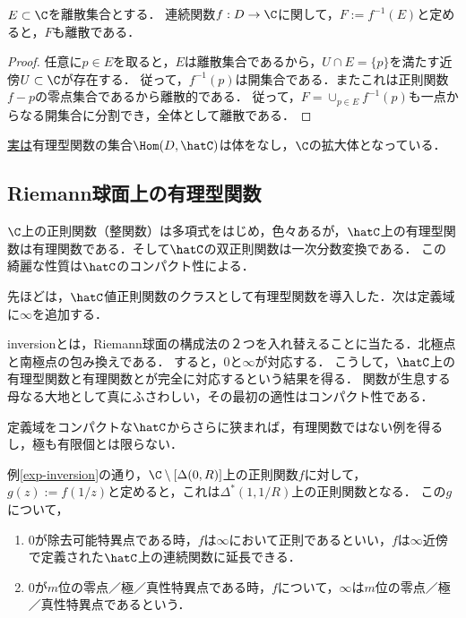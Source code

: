 \documentclass[uplatex, dvipdfmx]{jsreport}
\begin{document}
\begin{lemma}[有理型関数は合成について閉じている]
    $E\subset\C$を離散集合とする．
    連続関数$f:D\to\C$に関して，$F:=f^{-1}(E)$と定めると，$F$も離散である．
\end{lemma}
\begin{proof}
    任意に$p\in E$を取ると，$E$は離散集合であるから，$U\cap E=\{p\}$を満たす近傍$U\subset\C$が存在する．
    従って，$f^{-1}(p)$は開集合である．またこれは正則関数$f-p$の零点集合であるから離散的である．
    従って，$F=\cup_{p\in E}f^{-1}(p)$も一点からなる開集合に分割でき，全体として離散である．
\end{proof}

\begin{remark}
    \href{https://ja.wikipedia.org/wiki/有理型関数}{実は}有理型関数の集合$\Hom(D,\hatC)$は体をなし，$\C$の拡大体となっている．
\end{remark}

\subsection{Riemann球面上の有理型関数}

\begin{tcolorbox}[colframe=ForestGreen, colback=ForestGreen!10!white,breakable,colbacktitle=ForestGreen!40!white,coltitle=black,fonttitle=\bfseries\sffamily,
title=]
    $\C$上の正則関数（整関数）は多項式をはじめ，色々あるが，$\hatC$上の有理型関数は有理関数である．そして$\hatC$の双正則関数は一次分数変換である．
    この綺麗な性質は$\hatC$のコンパクト性による．
\end{tcolorbox}

\begin{screen}
    先ほどは，$\hatC$値正則関数のクラスとして有理型関数を導入した．次は定義域に$\infty$を追加する．

    inversionとは，Riemann球面の構成法の２つを入れ替えることに当たる．北極点と南極点の包み換えである．
    すると，$0$と$\infty$が対応する．
    こうして，$\hatC$上の有理型関数と有理関数とが完全に対応するという結果を得る．
    関数が生息する母なる大地として真にふさわしい，その最初の適性はコンパクト性である．

    定義域をコンパクトな$\hatC$からさらに狭まれば，有理関数ではない例を得るし，極も有限個とは限らない．
\end{screen}

\begin{definition}[北極点での正則性]
    例\ref{exp-inversion}の通り，$\C\setminus[\Delta(0,R)]$上の正則関数$f$に対して，$g(z):=f(1/z)$と定めると，これは$\Delta^*(1,1/R)$上の正則関数となる．
    この$g$について，
    \begin{enumerate}
        \item $0$が除去可能特異点である時，$f$は$\infty$において正則であるといい，$f$は$\infty$近傍で定義された$\hatC$上の連続関数に延長できる．
        \item $0$が$m$位の零点／極／真性特異点である時，$f$について，$\infty$は$m$位の零点／極／真性特異点であるという．
    \end{enumerate}
\end{definition}
\end{document}
